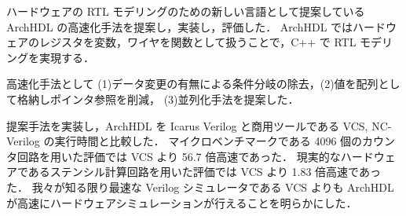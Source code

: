 ハードウェアの RTL モデリングのための新しい言語として提案している ArchHDL の高速化手法を提案し，実装し，評価した．
ArchHDL ではハードウェアのレジスタを変数，ワイヤを関数として扱うことで，C++ で RTL モデリングを実現する．

高速化手法として (1)データ変更の有無による条件分岐の除去，(2)値を配列として格納しポインタ参照を削減，
(3)並列化手法を提案した．

提案手法を実装し，ArchHDL を Icarus Verilog と商用ツールである VCS, NC-Verilog の実行時間と比較した．
マイクロベンチマークである 4096 個のカウンタ回路を用いた評価では VCS より 56.7 倍高速であった．
現実的なハードウェアであるステンシル計算回路を用いた評価では VCS より 1.83 倍高速であった．
我々が知る限り最速な Verilog シミュレータである VCS よりも ArchHDL が高速にハードウェアシミュレーションが行えることを明らかにした．
